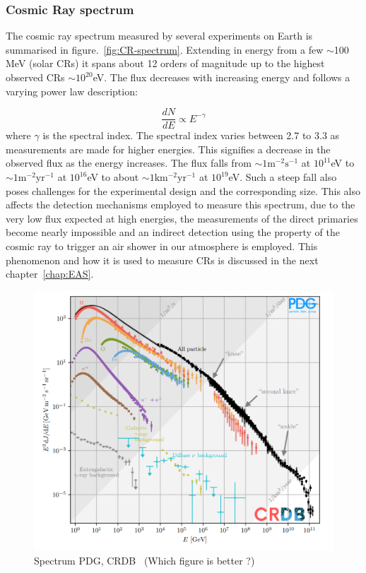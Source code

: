 \subsubsection*{Cosmic Ray spectrum}
\label{subsubsec:CRspectrum}
The cosmic ray spectrum measured by several experiments on Earth is summarised in figure.~\ref{fig:CR-spectrum}. Extending in energy from a few $\sim$100 MeV (solar CRs) it spans about 12 orders of magnitude up to the highest observed CRs $\sim 10^{20}$eV. The flux decreases with increasing energy and follows a varying power law description:

\begin{equation}
  \label{eq:Powlaw}
  \frac{dN}{dE} \propto E^{-\gamma}   
\end{equation}
where $\gamma$ is the spectral index. The spectral index varies between 2.7 to 3.3 as measurements are made for higher energies. This signifies a decrease in the observed flux as the energy increases. The flux falls from $\mathrm{\sim 1m^{-2} s^{-1}}$ at $10^{11}$eV to $\mathrm{\sim 1m^{-2} yr^{-1}}$ at $10^{16}$eV to about $\mathrm{\sim 1km^{-2} yr^{-1}}$ at $10^{19}$eV. Such a steep fall also poses challenges for the experimental design and the corresponding size. This also affects the detection mechanisms employed to measure this spectrum, due to the very low flux expected at high energies, the measurements of the direct primaries become nearly impossible and an indirect detection using the property of the cosmic ray to trigger an air shower in our atmosphere is employed. This phenomenon and how it is used to measure CRs is discussed in the next chapter~\ref{chap:EAS}.

\begin{figure}[t!]
  \centering
  \includegraphics[width=14.5cm]{thesis_figures/CRnNu/CR-spectrum.png}
  \caption{Spectrum PDG, CRDB~\cite{ParticleDataGroup:2024cfk} (Which figure is better ?)}
  \label{fig:CR-spectrum_scaled}
\end{figure}

